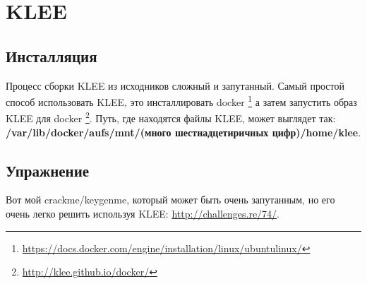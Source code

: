 \section{KLEE}

\subsection{Инсталляция}

Процесс сборки KLEE из исходников сложный и запутанный.
Самый простой способ использовать KLEE, это инсталлировать docker
\footnote{\url{https://docs.docker.com/engine/installation/linux/ubuntulinux/}} а затем запустить образ KLEE для docker
\footnote{\url{http://klee.github.io/docker/}}.
Путь, где находятся файлы KLEE, может выглядет так:
\textbf{/var/lib/docker/aufs/mnt/(много шестнадцетиричных цифр)/home/klee}.














\subsection{Упражнение}

Вот мой crackme/keygenme, который может быть очень запутанным, но его очень легко решить используя KLEE:
\url{http://challenges.re/74/}.



